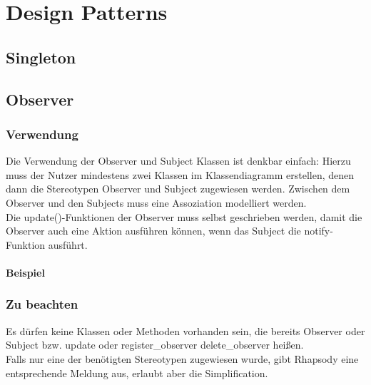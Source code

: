 \chapter{Design Patterns}

\section{Singleton}

\section{Observer}

\subsection{Verwendung}

Die Verwendung der Observer und Subject Klassen ist denkbar einfach: Hierzu muss
der Nutzer mindestens zwei Klassen im Klassendiagramm erstellen, denen dann die
Stereotypen Observer und Subject zugewiesen werden. Zwischen dem Observer und
den Subjects muss eine Assoziation modelliert werden. \\
Die update()-Funktionen der Observer muss selbst geschrieben werden, damit die
Observer auch eine Aktion ausführen können, wenn das Subject die notify-Funktion ausführt.

\subsubsection{Beispiel}

\subsection{Zu beachten}

Es dürfen keine Klassen oder Methoden vorhanden sein, die bereits Observer oder
Subject bzw. update oder register_observer delete_observer heißen.\\

Falls nur eine der benötigten Stereotypen zugewiesen wurde, gibt Rhapsody eine
entsprechende Meldung aus, erlaubt aber die Simplification.\\

